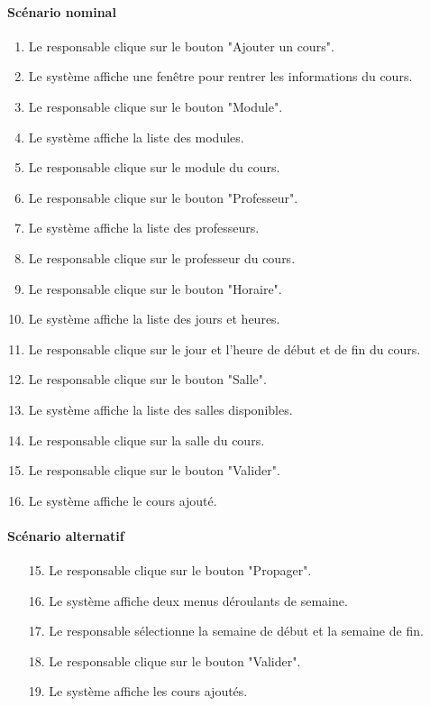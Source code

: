 \documentclass[a4paper,12pt]{article}
\begin{document}
\paragraph{Scénario nominal}
\begin{enumerate}
    \item Le responsable clique sur le bouton "Ajouter un cours".
    \item Le système affiche une fenêtre pour rentrer les informations du cours.
    \item Le responsable clique sur le bouton "Module".
    \item Le système affiche la liste des modules.
    \item Le responsable clique sur le module du cours.
    \item Le responsable clique sur le bouton "Professeur".
    \item Le système affiche la liste des professeurs.
    \item Le responsable clique sur le professeur du cours.
    \item Le responsable clique sur le bouton "Horaire".
    \item Le système affiche la liste des jours et heures.
    \item Le responsable clique sur le jour et l'heure de début et de fin du cours.
    \item Le responsable clique sur le bouton "Salle".
    \item Le système affiche la liste des salles disponibles.
    \item Le responsable clique sur la salle du cours.
    \item Le responsable clique sur le bouton "Valider".
    \item Le système affiche le cours ajouté.
\end{enumerate}

\paragraph{Scénario alternatif}
\begin{enumerate}
    \item[15.] Le responsable clique sur le bouton "Propager".
    \item[16.] Le système affiche deux menus déroulants de semaine.
    \item[17.] Le responsable sélectionne la semaine de début et la semaine de fin.
    \item[18.] Le responsable clique sur le bouton "Valider".
    \item[19.] Le système affiche les cours ajoutés.
\end{enumerate}
\end{document}
